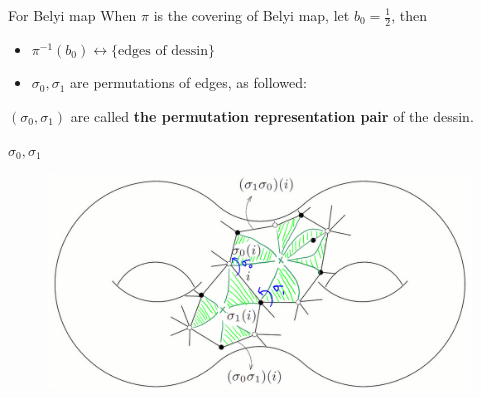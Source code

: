 \documentclass[pdf]{beamer}
\numberwithin{equation}{section}
\theoremstyle{plain}
\theoremstyle{plain}
\theoremstyle{remark}
\begin{document}
\begin{frame}{For Belyi map}
When $\pi$ is the covering of Belyi map, let $b_0=\frac{1}{2}$, then
\begin{itemize}
	\item $\pi^{-1}(b_0) \longleftrightarrow \{ \text{edges of dessin}\}$
	\item $\sigma_0,\sigma_1$ are permutations of edges, as followed:

\end{itemize}
$(\sigma_0,\sigma_1)$ are called \textbf{the permutation representation pair} of the dessin.
\end{frame}
\begin{frame}[fragile]{$\sigma_0,\sigma_1$}
\begin{figure}[th]
	\begin{minipage}[b]{\textwidth}
		\centering
		\includegraphics[width=\textwidth]{figures/5.png}
	\end{minipage}
\end{figure}
\end{frame}
\end{document}
